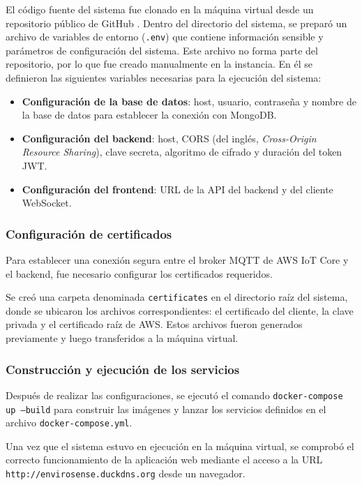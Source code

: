 El código fuente del sistema fue clonado en la máquina virtual desde un
repositorio público de GitHub \cite{EnviroSenseIoT}. Dentro del directorio del
sistema, se preparó un archivo de variables de entorno (\texttt{.env}) que
contiene información sensible y parámetros de configuración del sistema. Este
archivo no forma parte del repositorio, por lo que fue creado manualmente en la
instancia. En él se definieron las siguientes variables necesarias para la
ejecución del sistema:

\begin{itemize}
    \item \textbf{Configuración de la base de datos}: host, usuario, contraseña y
          nombre de la base de datos para establecer la conexión con MongoDB.
    \item \textbf{Configuración del backend}: host, CORS (del inglés,
          \textit{Cross-Origin Resource Sharing}), clave secreta, algoritmo de
          cifrado y duración del token JWT.
    \item \textbf{Configuración del frontend}: URL de la API del backend y del
          cliente WebSocket.
\end{itemize}

\subsubsection{Configuración de certificados}

Para establecer una conexión segura entre el broker MQTT de AWS IoT Core y el
backend, fue necesario configurar los certificados requeridos.

Se creó una carpeta denominada \texttt{certificates} en el directorio raíz del
sistema, donde se ubicaron los archivos correspondientes: el certificado del
cliente, la clave privada y el certificado raíz de AWS. Estos archivos fueron
generados previamente y luego transferidos a la máquina virtual.

\subsubsection{Construcción y ejecución de los servicios}

Después de realizar las configuraciones, se ejecutó el comando
\texttt{docker-compose up --build} para construir las imágenes y lanzar los
servicios definidos en el archivo \texttt{docker-compose.yml}.

Una vez que el sistema estuvo en ejecución en la máquina virtual, se comprobó
el correcto funcionamiento de la aplicación web mediante el acceso a la URL
\texttt{http://envirosense.duckdns.org} desde un navegador.

